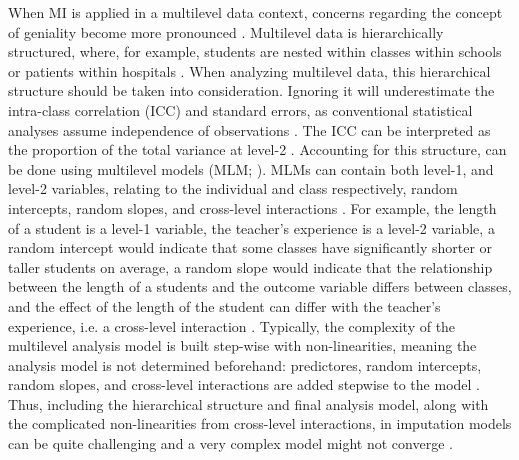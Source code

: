 \documentclass[10pt, a4paper, titlepage]{article}
\begin{document}
When MI is applied in a multilevel data context, concerns regarding the concept of geniality become more pronounced \citep{mistlerComparisonJointModel2017, enders2018, enders2018a, enders2020, buurenFlexibleImputationMissing2018, taljaard2008, enders2016, resche-rigon2018, audigier2018, dong2023, grund2016, grund2018a, grund2018, ludtke2017, grund2021, quartagno2022}. Multilevel data is hierarchically structured, where, for example, students are nested within classes within schools or patients within hospitals \citep{hox2017, hox2011}. When analyzing multilevel data, this hierarchical structure should be taken into consideration. Ignoring it will underestimate the intra-class correlation (ICC) and standard errors, as conventional statistical analyses assume independence of observations \citep{buurenFlexibleImputationMissing2018, ludtke2017, taljaard2008, hox2011}. The ICC can be interpreted as the proportion of the total variance at level-2 \citep{gulliford2005, shieh2012, hox2011}. Accounting for this structure, can be done using multilevel models (MLM; ). MLMs can contain both level-1, and level-2 variables, relating to the individual and class respectively, random intercepts, random slopes, and cross-level interactions \citep{hox2017, hox2011}. For example, the length of a student is a level-1 variable, the teacher's experience is a level-2 variable, a random intercept would indicate that some classes have significantly shorter or taller students on average, a random slope would indicate that the relationship between the length of a students and the outcome variable differs between classes, and the effect of the length of the student can differ with the teacher's experience, i.e. a cross-level interaction \citep{hox2017, hox2011}. Typically, the complexity of the multilevel analysis model is built step-wise with non-linearities, meaning the analysis model is not determined beforehand: predictores, random intercepts, random slopes, and cross-level interactions are added stepwise to the model \citep{hox2017, hox2011}. Thus, including the hierarchical structure and final analysis model, along with the complicated non-linearities from cross-level interactions, in imputation models can be quite challenging \citep{buurenFlexibleImputationMissing2018, burgette2010, hox2011} and a very complex model might not converge \citep{buurenFlexibleImputationMissing2018}.
\end{document}
